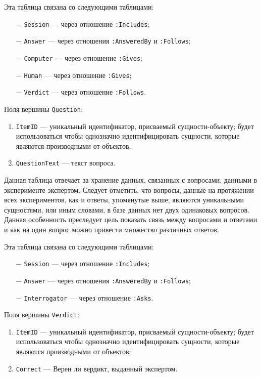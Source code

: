 Эта таблица связана со следующими таблицами:
\begin{itemize}
    \item[$-$] \texttt{Session} --- через отношение \texttt{:Includes};
    \item[$-$] \texttt{Answer} --- через отношения \texttt{:AnsweredBy} и \texttt{:Follows};
    \item[$-$] \texttt{Computer} --- через отношение \texttt{:Gives};
    \item[$-$] \texttt{Human} --- через отношение \texttt{:Gives};
    \item[$-$] \texttt{Verdict} --- через отношение \texttt{:Follows}.
\end{itemize}

Поля вершины \texttt{Question}:
\begin{enumerate}
    \item \texttt{ItemID} --- уникальный идентификатор, присваемый сущности-объекту; будет использоваться чтобы однозначно идентифицировать сущности, которые являются производными от объектов.
    \item \texttt{QuestionText} --- текст вопроса.
\end{enumerate}

Данная таблица отвечает за хранение данных, связанных с вопросами, данными в эксперименте экспертом. 
Следует отметить, что вопросы, данные на протяжении всех экспериментов, как и ответы, упомянутые выше, являются уникальными сущностями, или иным словами, в базе данных нет двух одинаковых вопросов.
Данная особенность преследует цель показать связь между вопросами и ответами и как на один вопрос можно привести множество различных ответов.

Эта таблица связана со следующими таблицами:
\begin{itemize}
    \item[$-$] \texttt{Session} --- через отношение \texttt{:Includes};
    \item[$-$] \texttt{Answer} --- через отношения \texttt{:AnsweredBy} и \texttt{:Follows};
    \item[$-$] \texttt{Interrogator} --- через отношение \texttt{:Asks}.
\end{itemize}

Поля вершины \texttt{Verdict}:
\begin{enumerate}
    \item \texttt{ItemID} --- уникальный идентификатор, присваемый сущности-объекту; будет использоваться чтобы однозначно идентифицировать сущности, которые являются производными от объектов;
    \item \texttt{Correct} --- Верен ли вердикт, выданный экспертом.
\end{enumerate}

